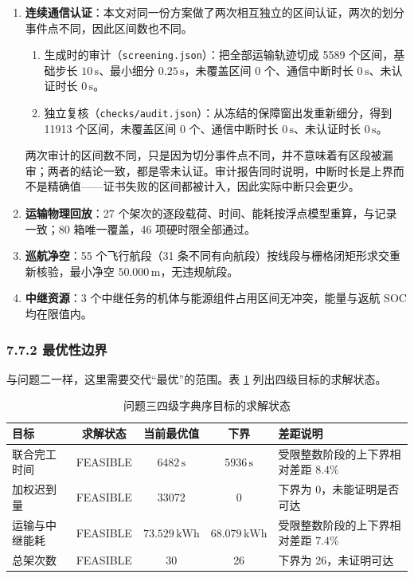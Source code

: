 \documentclass[withoutpreface,bwprint]{format}
\begin{document}
\begin{enumerate}[leftmargin=*]
    \item \textbf{连续通信认证}：本文对同一份方案做了两次相互独立的区间认证，两次的划分事件点不同，因此区间数也不同。

    \begin{enumerate}[label=(\alph*), leftmargin=*]
        \item 生成时的审计（\texttt{screening.json}）：把全部运输轨迹切成 5589 个区间，基础步长 $10\,\text{s}$、最小细分 $0.25\,\text{s}$，未覆盖区间 $0$ 个、通信中断时长 $0\,\text{s}$、未认证时长 $0\,\text{s}$。
        \item 独立复核（\texttt{checks/audit.json}）：从冻结的保障窗出发重新细分，得到 11913 个区间，未覆盖区间 $0$ 个、通信中断时长 $0\,\text{s}$、未认证时长 $0\,\text{s}$。
    \end{enumerate}

    两次审计的区间数不同，只是因为切分事件点不同，并不意味着有区段被漏审；两者的结论一致，都是零未认证。审计报告同时说明，中断时长是上界而不是精确值——证书失败的区间都被计入，因此实际中断只会更少。
    \item \textbf{运输物理回放}：27 个架次的逐段载荷、时间、能耗按浮点模型重算，与记录一致；80 箱唯一覆盖，46 项硬时限全部通过。
    \item \textbf{巡航净空}：55 个飞行航段（31 条不同有向航段）按线段与栅格闭矩形求交重新核验，最小净空 $50.000\,\text{m}$，无违规航段。
    \item \textbf{中继资源}：3 个中继任务的机体与能源组件占用区间无冲突，能量与返航 SOC 均在限值内。
\end{enumerate}

\subsubsection{7.7.2 最优性边界}
与问题二一样，这里需要交代“最优”的范围。表 \ref{tab:q3_stages} 列出四级目标的求解状态。

\begin{table}[H]
\centering
\small
\caption{问题三四级字典序目标的求解状态}
\label{tab:q3_stages}
\begin{tabularx}{\textwidth}{l c c c >{\raggedright\arraybackslash}X}
\toprule
\textbf{目标} & \textbf{求解状态} & \textbf{当前最优值} & \textbf{下界} & \textbf{差距说明} \\
\midrule
联合完工时间 & FEASIBLE & $6482\,\text{s}$ & $5936\,\text{s}$ & 受限整数阶段的上下界相对差距 $8.4\%$ \\
加权迟到量 & FEASIBLE & 33072 & 0 & 下界为 0，未能证明是否可达 \\
运输与中继能耗 & FEASIBLE & $73.529\,\text{kWh}$ & $68.079\,\text{kWh}$ & 受限整数阶段的上下界相对差距 $7.4\%$ \\
总架次数 & FEASIBLE & 30 & 26 & 下界为 26，未证明可达 \\
\bottomrule
\end{tabularx}
\end{table}
\end{document}

